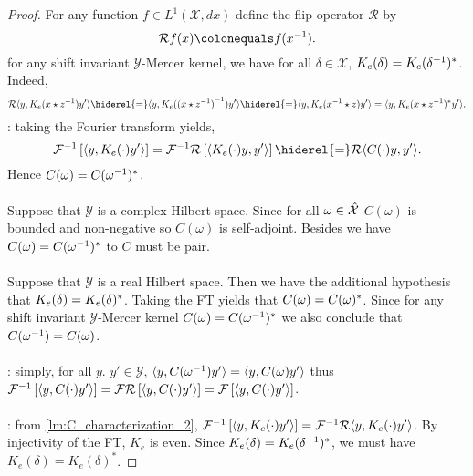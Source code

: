 \begin{proof}
For any function $f\in L^1(\mathcal{X},dx)$ define the flip operator $\mathcal{R}$ by
\begin{dmath*}
\mathcal{R}f(x) \colonequals f(\inv{x}).
\end{dmath*}
for any shift invariant $\mathcal{Y}$-Mercer kernel, we have for all $\delta\in\mathcal{X}$,  $K_e(\delta)=K_e({\delta}^{-1})^*$. Indeed,
\begin{dmath*}
\mathcal{R}\inner{y,K_e(x\groupop \inv{z})y'}\hiderel{=}\inner{y,K_e(\inv{(x\groupop \inv{z})})y'}\hiderel{=}\inner{y,K_e(\inv{x}\groupop z)y'}=\inner{y,K_e(x\groupop \inv{z})^\adjoint y'}.
\end{dmath*}
: taking the Fourier transform yields,
\begin{dmath*}
\IFT{\inner{y, K_e(\cdot)y'}}=\mathcal{F}^{-1}\mathcal{R}\left[\inner{K_e(\cdot)y, y'}\right]
\hiderel{=}\mathcal{R}\inner{C(\cdot)y, y'}.
\end{dmath*}
Hence $C(\omega)=C({\omega}^{-1})^*$.
\paragraph{}
Suppose that $\mathcal{Y}$ is a complex Hilbert space. Since for all $\omega\in\mathcal{\hat{X}}$ $C(\omega)$ is bounded and non-negative so $C(\omega)$ is self-adjoint. Besides we have $C(\omega)=C({\omega}^{-1})^*$ to $C$ must be pair.
\paragraph{}
Suppose that $\mathcal{Y}$ is a real Hilbert space. Then we have the additional hypothesis that $K_e(\delta)=K_e(\delta)^*$. Taking the \acl{FT} yields that $C(\omega)=C(\omega)^*$. Since for any shift invariant $\mathcal{Y}$-Mercer kernel $C(\omega)=C({\omega}^{-1})^*$ we also conclude that $C({\omega}^{-1})=C(\omega)$.
\paragraph{}
: simply, for all $y$. $y'\in\mathcal{Y}$, $\langle y, C({\omega}^{-1})y'\rangle=\langle y, C(\omega)y'\rangle$ thus $\mathcal{F}^{-1}\left[\langle y, C(\cdot)y'\rangle\right]=\mathcal{F}\mathcal{R}\left[\langle y, C(\cdot)y'\rangle\right]=\mathcal{F}\left[\langle y, C(\cdot)y'\rangle\right]$.
\paragraph{}
: from \cref{lm:C_characterization_2}, $\mathcal{F}^{-1}\left[\langle y, K_e(\cdot)y'\rangle\right] = \mathcal{F}^{-1}\mathcal{R}{\langle y, K_e(\cdot)y'\rangle}$. By injectivity of the \acl{FT}, $K_e$ is even. Since $K_e(\delta)=K_e({\delta}^{-1})^*$, we must have $K_e(\delta)=K_e(\delta)^*$. 
\end{proof}


